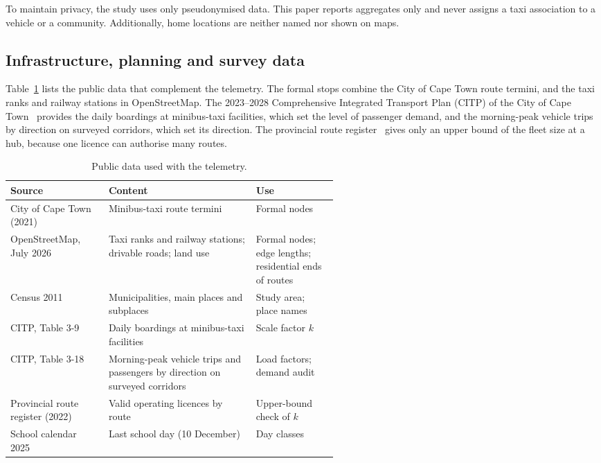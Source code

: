 \documentclass{elsarticle}
\begin{document}
To maintain privacy, the study uses only pseudonymised data. This paper reports aggregates only and never assigns a taxi association to a vehicle or a community. Additionally, home locations are neither named nor shown on maps.

\subsection{Infrastructure, planning and survey data}
\label{sec:spatial_data}

Table~\ref{tab:reference_data} lists the public data that complement the telemetry. The formal stops combine the City of Cape Town route termini, and the taxi ranks and railway stations in OpenStreetMap. The 2023--2028 Comprehensive Integrated Transport Plan (CITP) of the City of Cape Town~\cite{coct2023_citp} provides the daily boardings at minibus-taxi facilities, which set the level of passenger demand, and the morning-peak vehicle trips by direction on surveyed corridors, which set its direction. The provincial route register~\cite{wcpp2022_transport_public_works} gives only an upper bound of the fleet size at a hub, because one licence can authorise many routes.

\begin{table}[htbp]
    \centering
    \footnotesize
    \caption[Public data used with the telemetry]{Public data used with the telemetry.}
    \label{tab:reference_data}
    \begin{tabularx}{\linewidth}{@{}>{\raggedright\arraybackslash}p{0.3\linewidth}>{\raggedright\arraybackslash}X>{\raggedright\arraybackslash}p{0.25\linewidth}@{}}
        \toprule
        \textbf{Source} & \textbf{Content} & \textbf{Use} \\
        \midrule
        City of Cape Town (2021)~\cite{coct2021_taxiroutes} & Minibus-taxi route termini & Formal nodes \\
        OpenStreetMap, July 2026~\cite{openstreetmap2026_south_africa} & Taxi ranks and railway stations; drivable roads; land use & Formal nodes; edge lengths; residential ends of routes \\
        Census 2011~\cite{statssa2012_census2011, frith2013_census2011} & Municipalities, main places and subplaces & Study area; place names \\
        CITP, Table 3-9~\cite{coct2023_citp} & Daily boardings at minibus-taxi facilities & Scale factor $k$ \\
        CITP, Table 3-18~\cite{coct2023_citp} & Morning-peak vehicle trips and passengers by direction on surveyed corridors & Load factors; demand audit \\
        Provincial route register (2022)~\cite{wcpp2022_transport_public_works} & Valid operating licences by route & Upper-bound check of $k$ \\
        School calendar 2025~\cite{dbe2023_school_calendar} & Last school day (10 December) & Day classes \\
        \bottomrule
    \end{tabularx}
\end{table}
\end{document}
